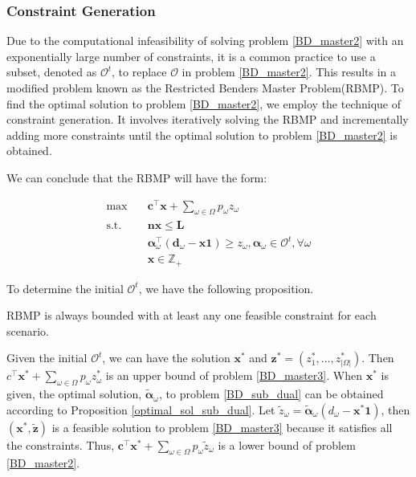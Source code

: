 \subsubsection{Constraint Generation}\label{bender_stage}

Due to the computational infeasibility of solving problem \eqref{BD_master2} with an exponentially large number of constraints, it is a common practice to use a subset, denoted as $\mathcal{O}^t$, to replace $\mathcal{O}$ in problem \eqref{BD_master2}. This results in a modified problem known as the Restricted Benders Master Problem(RBMP). To find the optimal solution to problem \eqref{BD_master2}, we employ the technique of constraint generation. It involves iteratively solving the RBMP and incrementally adding more constraints until the optimal solution to problem \eqref{BD_master2} is obtained.

We can conclude that the RBMP will have the form:

\begin{equation}\label{BD_master3}
  \begin{aligned}
    \max \quad & \mathbf{c}^{\intercal} \mathbf{x} + \sum_{\omega \in \Omega} p_{\omega} z_{\omega} \\
    \text {s.t.} \quad & \mathbf{n} \mathbf{x} \leq \mathbf{L} \\
    & \bm{\alpha}_{\omega}^{\intercal}(\mathbf{d}_{\omega}- \mathbf{x} \mathbf{1}) \geq z_{\omega}, \bm{\alpha}_{\omega} \in \mathcal{O}^{t}, \forall \omega \\
     & \mathbf{x} \in \mathbb{Z}_{+}
  \end{aligned}
\end{equation}

To determine the initial $\mathcal{O}^{t}$, we have the following proposition.

\begin{prop}\label{one_ep_feasible}
    RBMP is always bounded with at least any one feasible constraint for each scenario.
    \end{prop}
    
Given the initial $\mathcal{O}^{t}$, we can have the solution $\mathbf{x}^{*}$ and $\mathbf{z}^{*} =(z^{*}_1,\ldots, z^{*}_{|\Omega|})$. Then $c^{\intercal} \mathbf{x}^{*} + \sum_{\omega \in \Omega} p_{\omega} z_{\omega}^{*}$ is an upper bound of problem \eqref{BD_master3}. When $\mathbf{x}^{*}$ is given, the optimal solution, $\bm{\tilde{\alpha}}_{\omega}$, to problem \eqref{BD_sub_dual} can be obtained according to Proposition \ref{optimal_sol_sub_dual}. Let $\tilde{z}_{\omega} = \bm{\tilde{\alpha}}_{\omega}(d_{\omega} - \mathbf{x}^{*} \mathbf{1})$, then $(\mathbf{x}^{*}, \mathbf{\tilde{z}})$ is a feasible solution to problem \eqref{BD_master3} because it satisfies all the constraints. Thus, $\mathbf{c}^{\intercal} \mathbf{x}^{*} + \sum_{\omega \in \Omega} p_{\omega} \tilde{z}_{\omega}$ is a lower bound of problem \eqref{BD_master2}.

